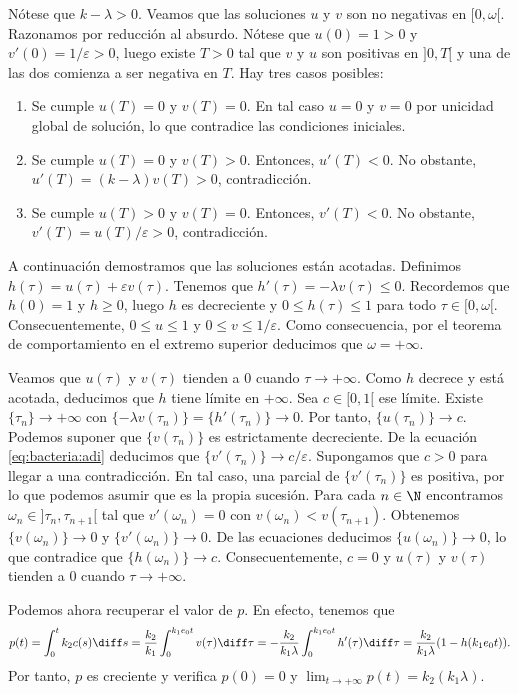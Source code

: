\documentclass{article}
\begin{document}
\begin{ex}
  Nótese que $k - \lambda > 0$. Veamos que las soluciones $u$ y $v$ son no negativas en
  $[0, \omega[$. Razonamos por reducción al absurdo. Nótese que $u(0) = 1 > 0$ y
  $v'(0) = 1/\varepsilon >0$, luego existe $T> 0$ tal que $v$ y $u$ son positivas en $]0, T[$ y una
  de las dos comienza a ser negativa en $T$. Hay tres casos posibles:
  \begin{enumerate}
  \item Se cumple $u(T) = 0$ y $v(T) = 0$. En tal caso $u = 0$ y $v = 0$ por unicidad global de
    solución, lo que contradice las condiciones iniciales.
  \item Se cumple $u(T) = 0$ y $v(T) > 0$. Entonces, $u'(T) < 0$. No obstante,
    $u'(T) = (k-\lambda)v(T) > 0$, contradicción.
  \item Se cumple $u(T) > 0$ y $v(T) = 0$. Entonces, $v'(T) < 0$. No obstante,
    $v'(T) = u(T) / \varepsilon > 0$, contradicción.
  \end{enumerate}

  A continuación demostramos que las soluciones están acotadas. Definimos
  $h(\tau) = u(\tau) + \varepsilon v(\tau)$. Tenemos que $h'(\tau) = -\lambda v(\tau) \le
  0$. Recordemos que $h(0) = 1$ y $h \ge 0$, luego $h$ es decreciente y $0 \le h(\tau) \le 1$ para
  todo $\tau \in [0,\omega[$. Consecuentemente, $0 \le u \le 1$ y $0 \le v \le 1/\varepsilon$. Como
  consecuencia, por el teorema de comportamiento en el extremo superior deducimos que
  $\omega = +\infty$.

  Veamos que $u(\tau)$ y $v(\tau)$ tienden a $0$ cuando $\tau \to +\infty$. Como $h$ decrece y está
  acotada, deducimos que $h$ tiene límite en $+\infty$. Sea $c \in [0,1[$ ese límite. Existe
  $\{\tau_n\} \to +\infty$ con $\{-\lambda v(\tau_n)\} = \{h'(\tau_n)\} \to 0$. Por tanto,
  $\{u(\tau_n)\} \to c$. Podemos suponer que $\{v(\tau_n)\}$ es estrictamente decreciente. De la
  ecuación \eqref{eq:bacteria:adi} deducimos que $\{v'(\tau_n)\} \to c / \varepsilon$. Supongamos
  que $c > 0$ para llegar a una contradicción. En tal caso, una parcial de $\{v'(\tau_n)\}$ es
  positiva, por lo que podemos asumir que es la propia sucesión. Para cada $n \in \N$ encontramos
  $\omega_n \in ]\tau_n, \tau_{n+1}[$ tal que $v'(\omega_n) = 0$ con $v(\omega_n) <
  v(\tau_{n+1})$. Obtenemos $\{v(\omega_n)\} \to 0$ y $\{v'(\omega_n)\} \to 0$. De las ecuaciones
  deducimos $\{u(\omega_n)\} \to 0$, lo que contradice que $\{h(\omega_n)\} \to
  c$. Consecuentemente, $c = 0$ y $u(\tau)$ y $v(\tau)$ tienden a $0$ cuando $\tau \to +\infty$.

  Podemos ahora recuperar el valor de $p$. En efecto, tenemos que
  \[ p(t) = \int_0^t k_2 c(s) \diff s = \frac{k_2}{k_1} \int_0^{k_1 e_0 t} v(\tau) \diff \tau =
    -\frac{k_2}{k_1 \lambda} \int_0^{k_1 e_0 t} h'(\tau) \diff \tau = \frac{k_2}{k_1 \lambda} (1 -
    h(k_1 e_0 t)). \] Por tanto, $p$ es creciente y verifica $p(0) = 0$ y
  $\lim_{t \to +\infty} p(t) = k_2 (k_1 \lambda)$.
\end{ex}
\end{document}
